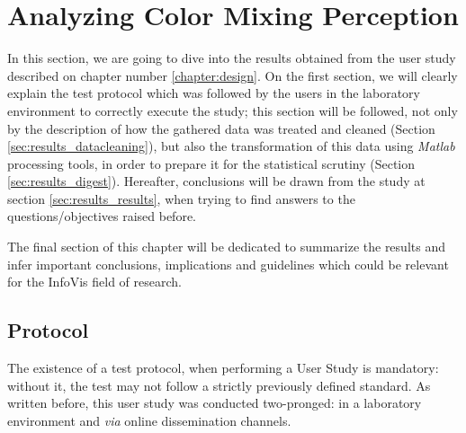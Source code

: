 
\chapter{Analyzing Color Mixing Perception}
\label{chapter:results}
%
In this section, we are going to dive into the results obtained from the user study described on chapter number \ref{chapter:design}.
On the first section, we will clearly explain the test protocol which was followed by the users in the laboratory environment to correctly
execute the study; this section will be followed, not only by the description of how the gathered data was treated and cleaned
(Section \ref{sec:results_datacleaning}), but also the transformation of this data using \emph{Matlab} processing tools, in order to prepare
it for the statistical scrutiny (Section \ref{sec:results_digest}). Hereafter, conclusions will be drawn from the study at section
\ref{sec:results_results}, when trying to find answers to the questions/objectives raised before. \par
%
The final section of this chapter will be dedicated to summarize the results and infer important conclusions, implications and guidelines which
could be relevant for the InfoVis field of research.
\section{Protocol}
\label{sec:results_protocol}
%
The existence of a test protocol, when performing a User Study is mandatory: without it, the test may not follow a strictly previously defined
standard. As written before, this user study was conducted two-pronged: in a laboratory environment and \emph{via} online dissemination channels. \par
%
